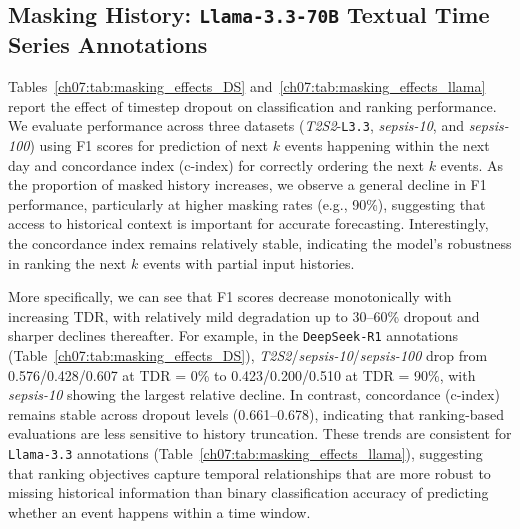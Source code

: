 \subsection{Masking History: \texttt{Llama-3.3-70B} Textual Time Series Annotations}\label{ch07:apd:masking_l33_dsr1}





Tables~\ref{ch07:tab:masking_effects_DS} and~\ref{ch07:tab:masking_effects_llama} report the effect of timestep dropout on classification and ranking performance. 
We evaluate performance across three datasets (\textit{T2S2}-\texttt{L3.3}, \textit{sepsis-10}, and \textit{sepsis-100}) using F1 scores for prediction of next \(k\) events happening within the next day and concordance index (c-index) for correctly ordering the next \(k\) events. 
As the proportion of masked history increases, we observe a general decline in F1 performance, particularly at higher masking rates (e.g., 90\%), suggesting that access to historical context is important for accurate forecasting. 
Interestingly, the concordance index remains relatively stable, indicating the model's robustness in ranking the next \(k\) events with partial input histories.

More specifically, we can see that F1 scores decrease monotonically with increasing TDR, with relatively mild degradation up to 30--60\% dropout and sharper declines thereafter.
For example, in the \texttt{DeepSeek-R1} annotations (Table~\ref{ch07:tab:masking_effects_DS}), \textit{T2S2}/\textit{sepsis-10}/\textit{sepsis-100} drop from 0.576/0.428/0.607 at TDR = 0\% to 0.423/0.200/0.510 at TDR = 90\%, with \textit{sepsis-10} showing the largest relative decline.
In contrast, concordance (c-index) remains stable across dropout levels (0.661--0.678), indicating that ranking-based evaluations are less sensitive to history truncation.
These trends are consistent for \texttt{Llama-3.3} annotations (Table~\ref{ch07:tab:masking_effects_llama}), suggesting that ranking objectives capture temporal relationships that are more robust to missing historical information than binary classification accuracy of predicting whether an event happens within a time window.









\FloatBarrier


